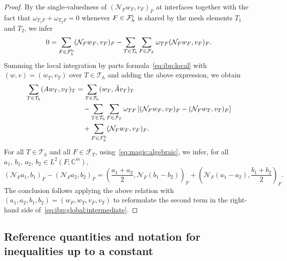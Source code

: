 \documentclass[11pt,a4paper]{article}
\theoremstyle{plain}
\theoremstyle{remark}
\theoremstyle{definition}
\newcommand{\Complex}{\mathbb{C}}
\newcommand{\Th}{\mathcal{T}_h}
\newcommand{\Fhb}{\mathcal{F}_h^{\rm b}}
\newcommand{\Fhi}{\mathcal{F}_h^{\rm i}}
\newcommand{\FT}{\mathcal{F}_T}
\begin{document}
\begin{proof}
  By the single-valuedness of $(\mathcal{N}_F w_F, v_F)_F$ at interfaces together with the fact that $\omega_{T_1F} + \omega_{T_2F} = 0$ whenever $F \in \Fhi$ is shared by the mesh elements $T_1$ and $T_2$, we infer
  \[
  0 = \sum_{F \in \Fhb} (\mathcal{N}_F w_F, v_F)_F
  - \sum_{T \in \Th} \sum_{F \in \FT} \omega_{TF} (\mathcal{N}_F w_F, v_F)_F.
  \]
  Summing the local integration by parts formula~\eqref{eq:ibp:local} with $(w,v) = (w_T, v_T)$ over $T \in \Th$ and adding the above expression, we obtain
  \begin{equation}\label{eq:ibp:global:intermediate}
    \begin{aligned}
      \sum_{T \in \Th} (A w_T, v_T)_T
      &= \sum_{T \in \Th} (w_T, \tilde{A} v_T)_T
      \\
      &\quad
      - \sum_{T \in \Th} \sum_{F \in \FT} \omega_{TF} \left[
        (\mathcal{N}_F w_F, v_F)_F
        - (\mathcal{N}_F w_T, v_T)_F
        \right]
      \\
      &\quad
      + \sum_{F \in \Fhb} (\mathcal{N}_F w_F, v_F)_F.
    \end{aligned}
  \end{equation}
  For all $T \in \Th$ and all $F \in \FT$, using~\eqref{eq:magic:algebraic}, we infer, for all $a_1,\,b_1,\,a_2,\,b_2 \in L^2(F;\Complex^m)$,
  \begin{equation}\label{eq:magic.formula}
    (\mathcal{N}_F a_1, b_1)_F
    - (\mathcal{N}_F a_2, b_2)_F
    = \left(\frac{a_1 + a_2}{2}, \mathcal{N}_F (b_1 - b_2)\right)_F
    + \left(\mathcal{N}_F (a_1 - a_2), \frac{b_1 + b_2}{2}\right)_F.
  \end{equation}
  The conclusion follows applying the above relation with $(a_1,a_2,b_1,b_2) = (w_F, w_T, v_F, v_T)$ to reformulate the second term in the right-hand side of~\eqref{eq:ibp:global:intermediate}.
\end{proof}

\subsection{Reference quantities and notation for inequalities up to a constant}\label{sec:scheme:inequalities}
\end{document}
